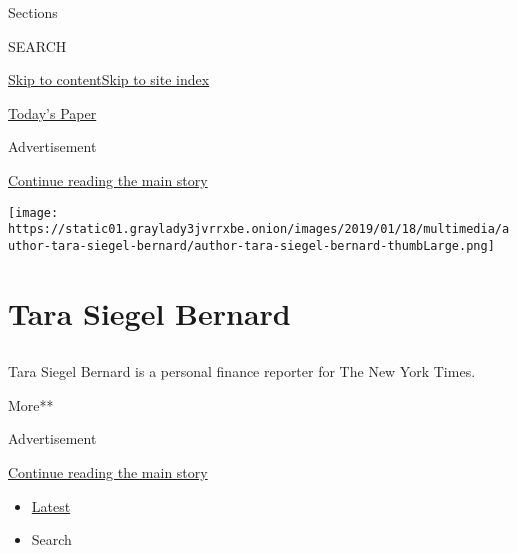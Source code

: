 Sections

SEARCH

\protect\hyperlink{site-content}{Skip to
content}\protect\hyperlink{site-index}{Skip to site index}

\href{https://myaccount.nytimes3xbfgragh.onion/auth/login?response_type=cookie\&client_id=vi}{}

\href{https://www.nytimes3xbfgragh.onion/section/todayspaper}{Today's
Paper}

Advertisement

\protect\hyperlink{after-top}{Continue reading the main story}

\texttt{[image: https://static01.graylady3jvrrxbe.onion/images/2019/01/18/multimedia/author-tara-siegel-bernard/author-tara-siegel-bernard-thumbLarge.png]}

\hypertarget{tara-siegel-bernard}{%
\section{Tara Siegel Bernard}\label{tara-siegel-bernard}}

\hypertarget{section}{%
\subsection{}\label{section}}

Tara Siegel Bernard is a personal finance reporter for The New York
Times.

More**

Advertisement

\protect\hyperlink{after-mid1}{Continue reading the main story}

\begin{itemize}
\tightlist
\item
  \protect\hyperlink{stream-panel}{Latest}
\item
  Search
\end{itemize}

